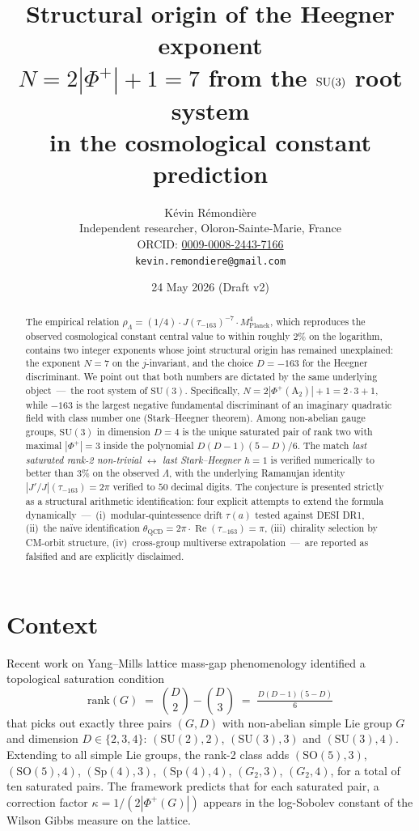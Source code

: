 \documentclass[11pt,a4paper]{article}
\title{\bfseries Structural origin of the Heegner exponent\\
  $N = 2|\Phi^{+}|+1 = 7$ from the $\SU(3)$ root system\\
  in the cosmological constant prediction}
\author{K\'evin R\'emondi\`ere\\
  \small Independent researcher, Oloron-Sainte-Marie, France\\
  \small ORCID: \href{https://orcid.org/0009-0008-2443-7166}{0009-0008-2443-7166}\\
  \small \texttt{kevin.remondiere@gmail.com}}
\date{24 May 2026 \quad (Draft v2)}
\newcommand{\SU}{\mathrm{SU}}
\newcommand{\SO}{\mathrm{SO}}
\newcommand{\Sp}{\mathrm{Sp}}
\renewcommand{\Re}{\operatorname{Re}}
\newcommand{\Mpl}{M_{\mathrm{Planck}}}
\newcommand{\rhoL}{\rho_{\Lambda}}
\newcommand{\thQCD}{\theta_{\mathrm{QCD}}}
\theoremstyle{plain}
\begin{document}
\maketitle

\begin{abstract}
The empirical relation $\rhoL = (1/4)\cdot J(\tau_{-163})^{-7}\cdot \Mpl^{4}$, which reproduces the observed cosmological constant central value to within roughly $2\%$ on the logarithm, contains two integer exponents whose joint structural origin has remained unexplained: the exponent $N=7$ on the $j$-invariant, and the choice $D=-163$ for the Heegner discriminant. We point out that both numbers are dictated by the same underlying object \,---\, the root system of $\SU(3)$. Specifically, $N=2|\Phi^{+}(\mathrm{A}_{2})|+1=2\cdot 3+1$, while $-163$ is the largest negative fundamental discriminant of an imaginary quadratic field with class number one (Stark--Heegner theorem). Among non-abelian gauge groups, $\SU(3)$ in dimension $D=4$ is the unique saturated pair of rank two with maximal $|\Phi^{+}|=3$ inside the polynomial $D(D-1)(5-D)/6$. The match \emph{last saturated rank-2 non-trivial} $\leftrightarrow$ \emph{last Stark--Heegner $h=1$} is verified numerically to better than $3\%$ on the observed $\Lambda$, with the underlying Ramanujan identity $|J'/J|(\tau_{-163})=2\pi$ verified to $50$ decimal digits. The conjecture is presented strictly as a structural arithmetic identification: four explicit attempts to extend the formula dynamically \,---\, (i)~modular-quintessence drift $\tau(a)$ tested against DESI DR1, (ii)~the naïve identification $\thQCD=2\pi\cdot\Re(\tau_{-163})=\pi$, (iii)~chirality selection by CM-orbit structure, (iv)~cross-group multiverse extrapolation \,---\, are reported as falsified and are explicitly disclaimed.
\end{abstract}

\section{Context}

Recent work on Yang--Mills lattice mass-gap phenomenology \cite{Remondiere2026roadmap} identified a topological saturation condition
\[
  \mathrm{rank}(G) \;=\; \binom{D}{2}-\binom{D}{3} \;=\; \tfrac{D(D-1)(5-D)}{6}
\]
that picks out exactly three pairs $(G,D)$ with non-abelian simple Lie group $G$ and dimension $D\in\{2,3,4\}$: $(\SU(2),2)$, $(\SU(3),3)$ and $(\SU(3),4)$. Extending to all simple Lie groups, the rank-2 class adds $(\SO(5),3)$, $(\SO(5),4)$, $(\Sp(4),3)$, $(\Sp(4),4)$, $(G_{2},3)$, $(G_{2},4)$, for a total of ten saturated pairs. The framework predicts that for each saturated pair, a correction factor $\kappa=1/(2|\Phi^{+}(G)|)$ appears in the log-Sobolev constant of the Wilson Gibbs measure on the lattice.
\end{document}
